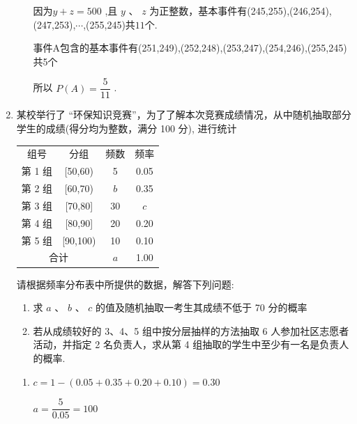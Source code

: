 \begin{enumerate}
\begin{jieda}
\begin{enumerate}
            因为$y + z = {500}$ ,且 $y$ 、 $z$ 为正整数，基本事件有(245,255),(246,254),(247,253),$\cdots$,(255,245)共$11$个.
            
            事件A包含的基本事件有(251,249),(252,248),(253,247),(254,246),(255,245)共5个
            
            所以 $P\left( A\right)  = \dfrac{5}{11}$ .
        \end{enumerate}
    \end{jieda}
    
    \item 某校举行了 “环保知识竞赛”，为了了解本次竞赛成绩情况，从中随机抽取部分学生的成绩(得分均为整数，满分 100 分), 进行统计

    \begin{center}
    \begin{tabular}{|c|c|c|c|}
    \hline
    组号 & 分组 & 频数 & 频率 \\
    \cline{1-4}
    第 1 组 & [50,60) & 5 & 0.05 \\
    \cline{1-4}
    第 2 组 & [60,70) & $b$ & 0.35 \\
    \cline{1-4}
    第 3 组 & [70,80] & 30 & $c$ \\
    \cline{1-4}
    第 4 组 & [80,90] & 20 & 0.20 \\
    \cline{1-4}
    第 5 组 & [90,100) & 10 & 0.10 \\
    \cline{1-4}
    \multicolumn{2}{|c|}{合计} & $a$ & 1.00 \\
    \cline{1-4}
    \hline
    \end{tabular}
    
    \end{center}
    
    请根据频率分布表中所提供的数据，解答下列问题: 
    \begin{enumerate}
        \item 求 $a$ 、 $b$ 、 $c$ 的值及随机抽取一考生其成绩不低于 70 分的概率
        \item 若从成绩较好的 3、4、5 组中按分层抽样的方法抽取 6 人参加社区志愿者活动，并指定 2 名负责人，求从第 4 组抽取的学生中至少有一名是负责人的概率.
    \end{enumerate}
    \begin{jieda}
        \begin{enumerate}
            \item $c = 1 - \left( {{0.05} + {0.35} + {0.20} + {0.10}}\right)  =0.30$
            
            $a = \dfrac{5}{0.05} = 100$
            

\end{enumerate}
\end{jieda}
\end{enumerate}
